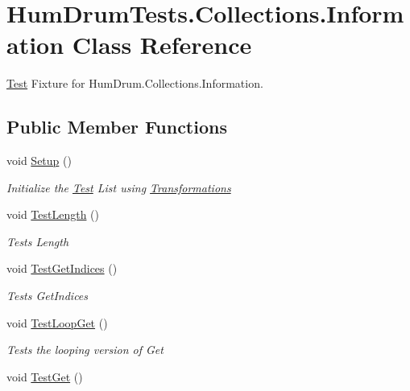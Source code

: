 \hypertarget{classHumDrumTests_1_1Collections_1_1Information}{}\section{Hum\+Drum\+Tests.\+Collections.\+Information Class Reference}
\label{classHumDrumTests_1_1Collections_1_1Information}


\hyperlink{classHumDrumTests_1_1Test}{Test} Fixture for Hum\+Drum.\+Collections.\+Information.  


\subsection*{Public Member Functions}
\begin{DoxyCompactItemize}
\item 
void \hyperlink{classHumDrumTests_1_1Collections_1_1Information_a18127bd4a65ef987c229c90d6281dd08}{Setup} ()
\begin{DoxyCompactList}\small\item\em Initialize the \hyperlink{classHumDrumTests_1_1Test}{Test} List using \hyperlink{classHumDrumTests_1_1Collections_1_1Transformations}{Transformations} \end{DoxyCompactList}\item 
void \hyperlink{classHumDrumTests_1_1Collections_1_1Information_a17fd7f7f4cfb6f6b93a6c920881c0e67}{Test\+Length} ()
\begin{DoxyCompactList}\small\item\em Tests Length \end{DoxyCompactList}\item 
void \hyperlink{classHumDrumTests_1_1Collections_1_1Information_ab10023ea742a6c7d55669521c4732f44}{Test\+Get\+Indices} ()
\begin{DoxyCompactList}\small\item\em Tests Get\+Indices \end{DoxyCompactList}\item 
void \hyperlink{classHumDrumTests_1_1Collections_1_1Information_a39dd37a60bb1d5abb66e1e8bae0d1eae}{Test\+Loop\+Get} ()
\begin{DoxyCompactList}\small\item\em Tests the looping version of Get \end{DoxyCompactList}\item 
void \hyperlink{classHumDrumTests_1_1Collections_1_1Information_ae07dbfd67a1d0f672abb62e9990bda43}{Test\+Get} ()

\end{DoxyCompactItemize}

